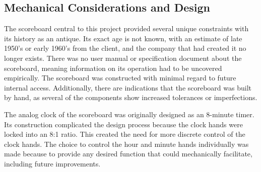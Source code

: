 \documentclass[11pt]{article}
\begin{document}
\subsection{Mechanical Considerations and Design}
\label{MechDesign}

The scoreboard central to this project provided several unique constraints with its history as an antique. 
Its exact age is not known, with an estimate of late 1950’s or early 1960’s from the client, and the company that had created it no longer exists. 
There was no user manual or specification document about the scoreboard, meaning information on its operation had to be uncovered empirically. 
The scoreboard was constructed 
with minimal regard to future internal access.
Additionally, there are indications that the scoreboard was built by hand, as several of the components show increased tolerances or imperfections.


The analog clock of the scoreboard was originally designed as an 8-minute timer. 
Its construction complicated the design process because the clock hands were locked into an 8:1 ratio. 
This created the need for more discrete control of the clock hands. 
The choice to control the hour and minute hands individually was made because to provide any desired function that could mechanically facilitate, including future improvements.
\end{document}
